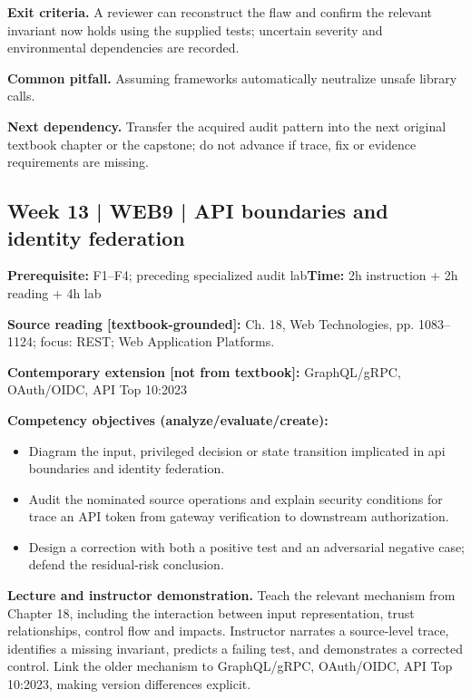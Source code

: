 \documentclass[10pt,letterpaper]{article}
\begin{document}
\textbf{Exit criteria.} A reviewer can reconstruct the flaw and confirm the relevant invariant now holds using the supplied tests; uncertain severity and environmental dependencies are recorded.

\textbf{Common pitfall.} Assuming frameworks automatically neutralize unsafe library calls.

\textbf{Next dependency.} Transfer the acquired audit pattern into the next original textbook chapter or the capstone; do not advance if trace, fix or evidence requirements are missing.

\subsection{Week 13 | WEB9 | API boundaries and identity federation}
\textbf{Prerequisite:} F1--F4; preceding specialized audit lab\hfill\textbf{Time:} 2h instruction + 2h reading + 4h lab

\textbf{Source reading [textbook-grounded]:} Ch. 18, Web Technologies, pp. 1083--1124; focus: REST; Web Application Platforms.

\textbf{Contemporary extension [not from textbook]:} GraphQL/gRPC, OAuth/OIDC, API Top 10:2023

\textbf{Competency objectives (analyze/evaluate/create):}
\begin{itemize}[leftmargin=*,itemsep=2pt]
\item Diagram the input, privileged decision or state transition implicated in api boundaries and identity federation.
\item Audit the nominated source operations and explain security conditions for trace an API token from gateway verification to downstream authorization.
\item Design a correction with both a positive test and an adversarial negative case; defend the residual-risk conclusion.
\end{itemize}
\textbf{Lecture and instructor demonstration.} Teach the relevant mechanism from Chapter 18, including the interaction between input representation, trust relationships, control flow and impacts. Instructor narrates a source-level trace, identifies a missing invariant, predicts a failing test, and demonstrates a corrected control. Link the older mechanism to GraphQL/gRPC, OAuth/OIDC, API Top 10:2023, making version differences explicit.
\end{document}
